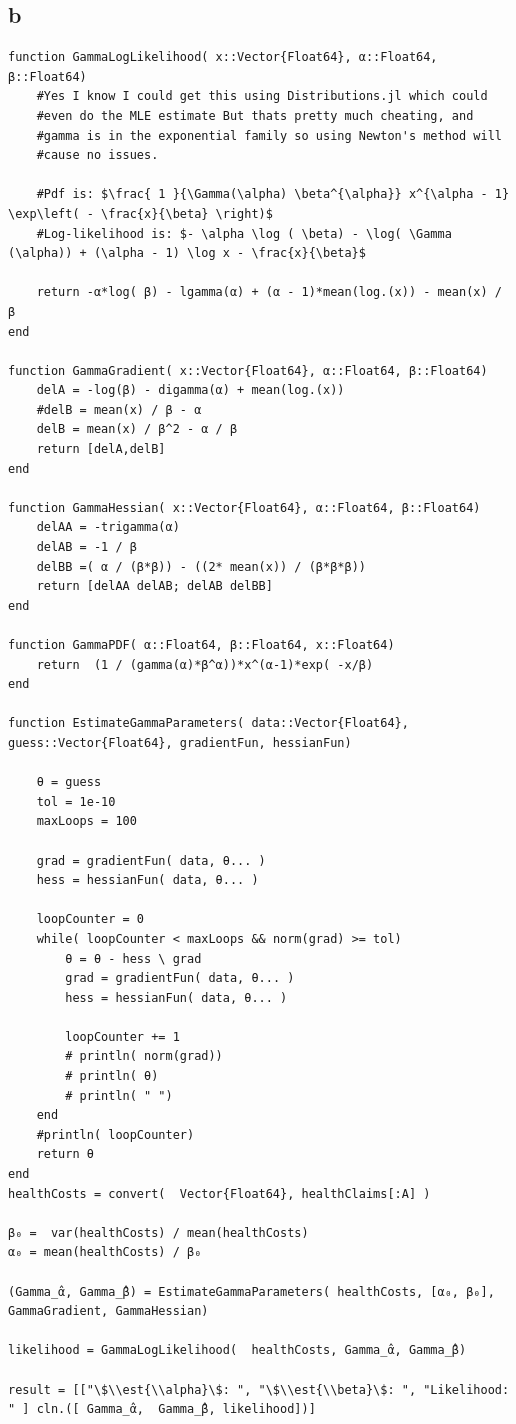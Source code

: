 \documentclass[12pt, letterpaper]{paper}
\begin{document}
\subsection{b}
\label{sec:org1889832}
\begin{verbatim}
function GammaLogLikelihood( x::Vector{Float64}, α::Float64, β::Float64)
    #Yes I know I could get this using Distributions.jl which could
    #even do the MLE estimate But thats pretty much cheating, and
    #gamma is in the exponential family so using Newton's method will
    #cause no issues.

    #Pdf is: $\frac{ 1 }{\Gamma(\alpha) \beta^{\alpha}} x^{\alpha - 1} \exp\left( - \frac{x}{\beta} \right)$
    #Log-likelihood is: $- \alpha \log ( \beta) - \log( \Gamma (\alpha)) + (\alpha - 1) \log x - \frac{x}{\beta}$

    return -α*log( β) - lgamma(α) + (α - 1)*mean(log.(x)) - mean(x) / β
end

function GammaGradient( x::Vector{Float64}, α::Float64, β::Float64)
    delA = -log(β) - digamma(α) + mean(log.(x))
    #delB = mean(x) / β - α
    delB = mean(x) / β^2 - α / β
    return [delA,delB]
end

function GammaHessian( x::Vector{Float64}, α::Float64, β::Float64)
    delAA = -trigamma(α)
    delAB = -1 / β
    delBB =( α / (β*β)) - ((2* mean(x)) / (β*β*β))
    return [delAA delAB; delAB delBB]
end

function GammaPDF( α::Float64, β::Float64, x::Float64)
    return  (1 / (gamma(α)*β^α))*x^(α-1)*exp( -x/β)
end

function EstimateGammaParameters( data::Vector{Float64}, guess::Vector{Float64}, gradientFun, hessianFun)

    θ = guess
    tol = 1e-10
    maxLoops = 100

    grad = gradientFun( data, θ... )
    hess = hessianFun( data, θ... )

    loopCounter = 0
    while( loopCounter < maxLoops && norm(grad) >= tol)
        θ = θ - hess \ grad
        grad = gradientFun( data, θ... )
        hess = hessianFun( data, θ... )

        loopCounter += 1
        # println( norm(grad))
        # println( θ)
        # println( " ")
    end
    #println( loopCounter)
    return θ
end
healthCosts = convert(  Vector{Float64}, healthClaims[:A] )

β₀ =  var(healthCosts) / mean(healthCosts)
α₀ = mean(healthCosts) / β₀

(Gamma_̂α, Gamma_̂β) = EstimateGammaParameters( healthCosts, [α₀, β₀], GammaGradient, GammaHessian)

likelihood = GammaLogLikelihood(  healthCosts, Gamma_̂α, Gamma_̂β)

result = [["\$\\est{\\alpha}\$: ", "\$\\est{\\beta}\$: ", "Likelihood: " ] cln.([ Gamma_̂α,  Gamma_̂β, likelihood])]

\end{verbatim}
\end{document}
